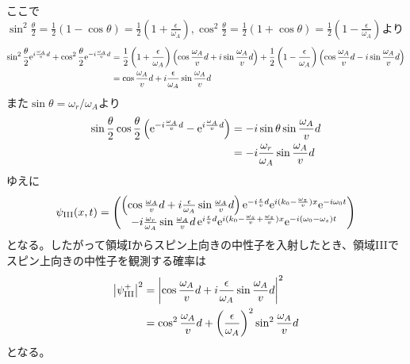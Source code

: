 ここで$\sin^2 \frac{\theta}{2}=\frac{1}{2}(1-\cos \theta) =\frac{1}{2} (1+\frac{\epsilon}{\omega_A}),\cos^2\frac{\theta}{2}=\frac{1}{2} (1+\cos\theta) =\frac{1}{2} (1-\frac{\epsilon}{\omega_A})$より
\begin{align}
\sin^2 \frac{\theta}{2} \mathrm{e}^{i\frac{\omega_A}{v}d} +\cos^2 \frac{\theta}{2} \mathrm{e}^{-i\frac{\omega_A}{v}d} &= \frac{1}{2} \left(1+\frac{\epsilon}{\omega_A}\right) \left(\cos \frac{\omega_A}{v}d+i\sin \frac{\omega_A}{v}d \right)+\frac{1}{2} \left(1-\frac{\epsilon}{\omega_A}\right) \left(\cos \frac{\omega_A}{v}d-i\sin \frac{\omega_A}{v}d \right) \notag \\
&=\cos \frac{\omega_A}{v}d +i\frac{\epsilon}{\omega_A} \sin \frac{\omega_A}{v}d
\end{align}
また$\sin\theta=\omega_r/\omega_A$より
\begin{align}
\sin\frac{\theta}{2}\cos\frac{\theta}{2} \left(\mathrm{e}^{-i\frac{\omega_A}{v}d}-\mathrm{e}^{i\frac{\omega_A}{v}d}\right) &=-i \sin \theta \sin \frac{\omega_A}{v}d \notag \\
&= -i \frac{\omega_r}{\omega_A} \sin \frac{\omega_A}{v}d
\end{align}
ゆえに
\begin{align}
\psi_\mathrm{III}(x,t)=\begin{pmatrix} \left(\cos \frac{\omega_A}{v}d +i\frac{\epsilon}{\omega_A} \sin \frac{\omega_A}{v}d\right) \mathrm{e}^{-i\frac{\epsilon}{v} d} \mathrm{e}^{i(k_0-\frac{\omega_z}{v})x}\mathrm{e}^{-i\omega_0t} \\ -i \frac{\omega_r}{\omega_A} \sin \frac{\omega_A}{v}d  \, \mathrm{e}^{i\frac{\epsilon}{v}d} \mathrm{e}^{i(k_0-\frac{\omega_s}{v}+\frac{\omega_z}{v})x}\mathrm{e}^{-i(\omega_0-\omega_s)t} \end{pmatrix}
\end{align}
となる。したがって領域Iからスピン上向きの中性子を入射したとき、領域IIIでスピン上向きの中性子を観測する確率は
\begin{align}
\bigl|\psi_\mathrm{III}^+\bigr|^2 &=\biggl |\cos \frac{\omega_A}{v}d +i\frac{\epsilon}{\omega_A} \sin \frac{\omega_A}{v}d\biggr|^2 \notag \\
&=\cos^2 \frac{\omega_A}{v}d+\left(\frac{\epsilon}{\omega_A}\right)^2\sin^2\frac{\omega_A}{v}d
\end{align} \label{Nonreso_1-reversal}
となる。

